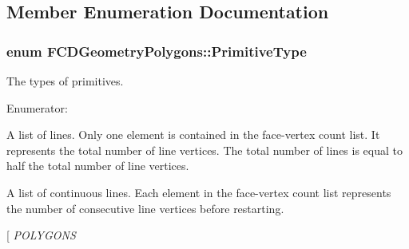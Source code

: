 \subsection{Member Enumeration Documentation}
\hypertarget{classFCDGeometryPolygons_a78fd93579665ea37c6d3396f4c4e8fac}{
\subsubsection[{PrimitiveType}]{\setlength{\rightskip}{0pt plus 5cm}enum {\bf FCDGeometryPolygons::PrimitiveType}}}
\label{classFCDGeometryPolygons_a78fd93579665ea37c6d3396f4c4e8fac}
The types of primitives. \begin{Desc}
\item[Enumerator: ]\par
\begin{description}
\item[{\em 
\hypertarget{classFCDGeometryPolygons_a78fd93579665ea37c6d3396f4c4e8faca19d3a4978cdce03bf99f36e7fd9b8f8c}{
LINES}
\label{classFCDGeometryPolygons_a78fd93579665ea37c6d3396f4c4e8faca19d3a4978cdce03bf99f36e7fd9b8f8c}
}]A list of lines. Only one element is contained in the face-\/vertex count list. It represents the total number of line vertices. The total number of lines is equal to half the total number of line vertices. \item[{\em 
\hypertarget{classFCDGeometryPolygons_a78fd93579665ea37c6d3396f4c4e8faca4f7e50d887fd20ae05131b31d30061e7}{
LINE\_\-STRIPS}
\label{classFCDGeometryPolygons_a78fd93579665ea37c6d3396f4c4e8faca4f7e50d887fd20ae05131b31d30061e7}
}]A list of continuous lines. Each element in the face-\/vertex count list represents the number of consecutive line vertices before restarting. \item[{\em 
\hypertarget{classFCDGeometryPolygons_a78fd93579665ea37c6d3396f4c4e8facac6923b1ee08ce77a7c973a4136b86989}{
POLYGONS}
\label{classFCDGeometryPolygons_a78fd93579665ea37c6d3396f4c4e8facac6923b1ee08ce77a7c973a4136b86989}
}
\end{description}
\end{Desc}
